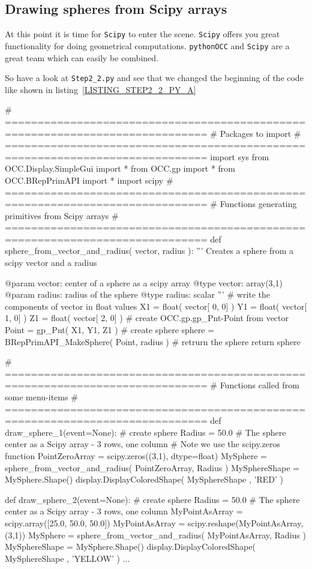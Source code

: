 \subsection{Drawing spheres from Scipy arrays}
At this point it is time for {\tt Scipy} to enter the scene.
{\tt Scipy} offers you great functionality for doing geometrical computations.
{\tt pythonOCC} and {\tt Scipy} are a great team which can easily be combined.

So have a look at {\tt Step2\_2.py} and see that we changed the beginning of the code like shown in listing~\ref{LISTING_STEP2_2_PY_A}
\begin{python}[moreemph={[4], 46, 48},caption={Step2\_1.py - Involve Scipy},label=LISTING_STEP2_2_PY_A]
# =============================================================================
# Packages to import
# =============================================================================
import sys
from OCC.Display.SimpleGui import *
from OCC.gp import *
from OCC.BRepPrimAPI import * 
import scipy
# =============================================================================
# Functions generating primitives from Scipy arrays
# =============================================================================
def sphere_from_vector_and_radius(  vector, 
                                    radius ):
    '''
    Creates a sphere from a scipy vector and a radius

    @param vector: center of a sphere as a scipy array
    @type  vector: array(3,1)
    @param radius: radius of the sphere
    @type  radius: scalar
    '''
    # write the components of vector in float values
    X1 = float( vector[ 0, 0] )
    Y1 = float( vector[ 1, 0] )
    Z1 = float( vector[ 2, 0] )
    # create OCC.gp.gp_Pnt-Point from vector
    Point = gp_Pnt( X1, Y1, Z1 )
    # create sphere
    sphere = BRepPrimAPI_MakeSphere( Point, radius )
    # retrurn the sphere
    return sphere 

# =============================================================================
# Functions called from some menu-items
# =============================================================================
def draw_sphere_1(event=None):
    # create sphere
    Radius = 50.0
    # The sphere center as a Scipy array - 3 rows, one column
    # Note we use the scipy.zeros function
    PointZeroArray = scipy.zeros((3,1), dtype=float)
    MySphere = sphere_from_vector_and_radius(   PointZeroArray, 
                                                Radius )
    MySphereShape = MySphere.Shape()
    display.DisplayColoredShape( MySphereShape , 'RED' ) 

def draw_sphere_2(event=None):
    # create sphere
    Radius = 50.0
    # The sphere center as a Scipy array - 3 rows, one column
    MyPointAsArray = scipy.array([25.0, 50.0, 50.0])
    MyPointAsArray = scipy.reshape(MyPointAsArray,(3,1))
    MySphere = sphere_from_vector_and_radius(   MyPointAsArray, 
                                                Radius )
    MySphereShape = MySphere.Shape()
    display.DisplayColoredShape( MySphereShape , 'YELLOW' ) 
...    
\end{python}
